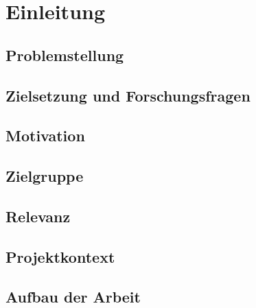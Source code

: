 
\chapter{Einleitung}\label{ch:einleitung}


\section{Problemstellung}


\section{Zielsetzung und Forschungsfragen}


\section{Motivation}


\section{Zielgruppe}


\section{Relevanz}


\section{Projektkontext}


\section{Aufbau der Arbeit}
